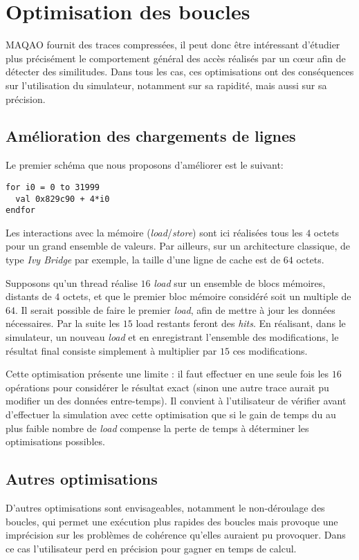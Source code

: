\section{Optimisation des boucles}

\textsc{MAQAO} fournit des traces compressées, il peut donc être intéressant d'étudier plus précisément le comportement général des accès réalisés par un c{\oe}ur afin de détecter des similitudes. Dans tous les cas, ces optimisations ont des conséquences sur l'utilisation du simulateur, notamment sur sa rapidité, mais aussi sur sa précision.

\subsection{Amélioration des chargements de lignes}

Le premier schéma que nous proposons d'améliorer est le suivant:\\
\begin{lstlisting}
for i0 = 0 to 31999
  val 0x829c90 + 4*i0
endfor
\end{lstlisting}

Les interactions avec la mémoire (\emph{load}/\emph{store}) sont ici réalisées tous les $4$ octets pour un grand ensemble de valeurs. Par ailleurs, sur un architecture classique, de type \textit{Ivy Bridge} par exemple, la taille d'une ligne de cache est de $64$ octets.

Supposons qu'un thread réalise $16$ \emph{load} sur un ensemble de blocs mémoires, distants de $4$ octets, et que le premier bloc mémoire considéré soit un multiple de $64$. Il serait possible de faire le premier \emph{load}, afin de mettre à jour les données nécessaires. Par la suite les $15$ load restants feront des \emph{hits}. En réalisant, dans le simulateur, un nouveau \emph{load} et en enregistrant l'ensemble des modifications, le résultat final consiste simplement à multiplier par $15$ ces modifications.

Cette optimisation présente une limite : il faut effectuer en une seule fois les $16$ opérations pour considérer le résultat exact (sinon une autre trace aurait pu modifier un des données entre-temps). Il convient à l'utilisateur de vérifier avant d'effectuer la simulation avec cette optimisation que si le gain de temps du au plus faible nombre de \emph{load} compense la perte de temps à déterminer les optimisations possibles.

\subsection{Autres optimisations}

D'autres optimisations sont envisageables, notamment le non-déroulage des boucles, qui permet une exécution plus rapides des boucles mais provoque une imprécision sur les problèmes de cohérence qu'elles auraient pu provoquer. Dans ce cas l'utilisateur perd en précision pour gagner en temps de calcul.
